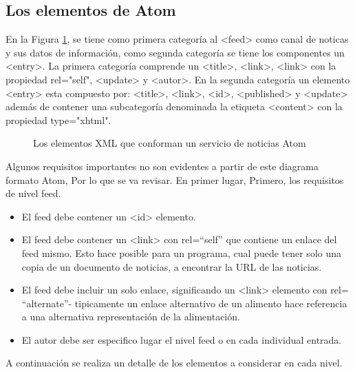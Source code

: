 \subsection{Los elementos de Atom}

En la Figura \ref{Los elementos XML que conforman un servicio de noticias Atom}, 
se tiene como primera categor\'{i}a al <feed> como canal de noticas y sus datos
de informaci\'{o}n, como segunda categor\'{i}a se tiene los componentes un <entry>.
La primera categor\'{i}a comprende un <title>, <link>, <link> con la
propiedad rel="self", <update> y <autor>. En la segunda categor\'{i}a un elemento
<entry> esta compuesto por: <title>, <link>, <id>, <published> y <update> adem\'{a}s
de contener una subcategor\'{i}a denominada la etiqueta <content> con la propiedad
type="xhtml".

\begin{figure}[!ht]
	\centering
	\caption{Los elementos XML que conforman un servicio de noticias Atom}
	\label{Los elementos XML que conforman un servicio de noticias Atom}
\end{figure}


Algunos requisitos importantes no son evidentes a partir de este diagrama formato
Atom, Por lo que se va revisar. En primer lugar, Primero, los requisitos de nivel feed.

\begin{itemize}

\item El feed debe contener un <id> elemento.
\item El feed debe contener un <link> con rel=\textquotedblleft self\textquotedblright 
que contiene un enlace del feed mismo. Esto hace posible para un programa, cual puede
tener solo una copia de un documento de noticias, a encontrar la URL de las noticias.
\item El feed debe incluir un solo enlace, significando un <link> elemento con rel=
\textquotedblleft alternate\textquotedblright - tipicamente un enlace alternativo de
un alimento hace referencia a una alternativa representaci\'{o}n de la alimentaci\'{o}n.
\item El autor debe ser especifico lugar el nivel feed o en cada individual entrada.

\end{itemize}

A continuaci\'{o}n se realiza un detalle de los elementos a considerar en cada 
nivel.\cite{johnson2006rss}

